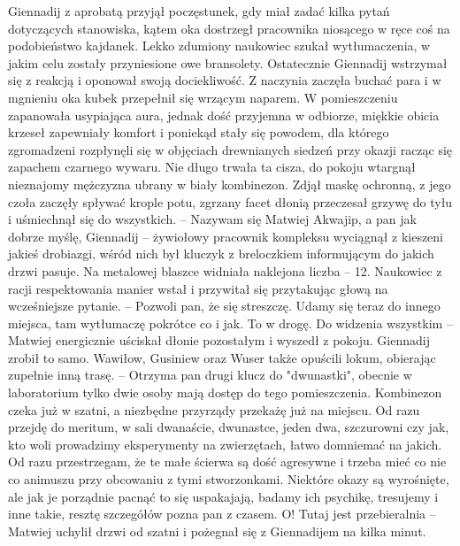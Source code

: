 \documentclass[../MAIN.tex]{subfiles}
\begin{document}
Giennadij z aprobatą przyjął poczęstunek, gdy miał zadać kilka pytań dotyczących stanowiska, kątem oka dostrzegł pracownika niosącego w ręce coś na podobieństwo kajdanek. Lekko zdumiony naukowiec szukał wytłumaczenia, w jakim celu zostały przyniesione owe bransolety. Ostatecznie Giennadij wstrzymał się z reakcją i oponował swoją dociekliwość. Z naczynia zaczęła buchać para i w mgnieniu oka kubek przepełnił się wrzącym naparem. W pomieszczeniu zapanowała usypiająca aura, jednak dość przyjemna w odbiorze, miękkie obicia krzeseł zapewniały komfort i poniekąd stały się powodem, dla którego zgromadzeni rozpłynęli się w objęciach drewnianych siedzeń przy okazji racząc się zapachem czarnego wywaru. Nie długo trwała ta cisza, do pokoju wtargnął nieznajomy mężczyzna ubrany w biały kombinezon. Zdjął maskę ochronną, z jego czoła zaczęły spływać krople potu, zgrzany facet dłonią przeczesał grzywę do tyłu i uśmiechnął się do wszystkich.
-- Nazywam się Matwiej Akwajip, a pan jak dobrze myślę, Giennadij -- żywiołowy pracownik kompleksu wyciągnął z kieszeni jakieś drobiazgi, wśród nich był kluczyk z breloczkiem informującym do jakich drzwi pasuje. Na metalowej blaszce widniała naklejona liczba -- 12. Naukowiec z racji respektowania manier wstał i przywitał się przytakując głową na wcześniejsze pytanie. 
-- Pozwoli pan, że się streszczę. Udamy się teraz do innego miejsca, tam wytłumaczę pokrótce co i jak. To w drogę. Do widzenia wszystkim -- Matwiej energicznie uściskał dłonie pozostałym i wyszedł z pokoju. Giennadij zrobił to samo. Wawiłow, Gusiniew oraz Wuser także opuścili lokum, obierając zupełnie inną trasę. 
-- Otrzyma pan drugi klucz do "dwunastki", obecnie w laboratorium tylko dwie osoby mają dostęp do tego pomieszczenia. Kombinezon czeka już w szatni, a niezbędne przyrządy przekażę już na miejscu. Od razu przejdę do meritum, w sali dwanaście, dwunastce, jeden dwa, szczurowni czy jak, kto woli prowadzimy eksperymenty na zwierzętach, łatwo domniemać na jakich. Od razu przestrzegam, że te małe ścierwa są dość agresywne i trzeba mieć co nie co animuszu przy obcowaniu z tymi stworzonkami. Niektóre okazy są wyrośnięte, ale jak je porządnie pacnąć to się uspakajają, badamy ich psychikę, tresujemy i inne takie, resztę szczegółów pozna pan z czasem. O! Tutaj jest przebieralnia -- Matwiej uchylił drzwi od szatni i pożegnał się z Giennadijem na kilka minut. 
\end{document}
